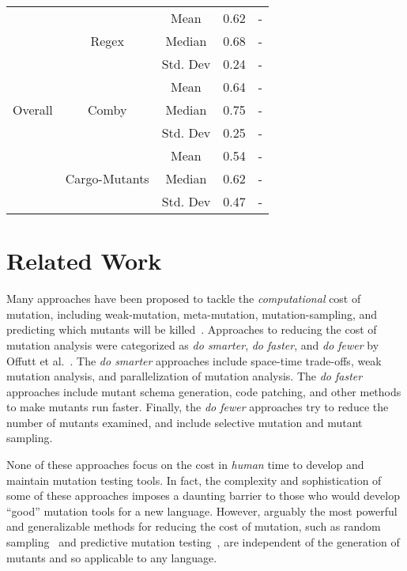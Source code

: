 \documentclass[sigconf,review, anonymous]{acmart}
\begin{document}
{\begin{table}[htbp]
{\begin{tabular}{|c|c|c|c|c|c|}
\multirow{9}{*}{Overall} & \multirow{3}{*}{Regex} & \multicolumn{2}{c|}{Mean} & 0.62  & -\\\cline{3-6}
    &   &  \multicolumn{2}{c|}{Median} & 0.68 & - \\\cline{3-6}
    &   &  \multicolumn{2}{c|}{Std. Dev} & 0.24 & - \\\cline{2-6}

 & \multirow{3}{*}{Comby} & \multicolumn{2}{c|}{Mean} & 0.64 & -\\\cline{3-6}
    &   &  \multicolumn{2}{c|}{Median} & 0.75 & - \\\cline{3-6}
    &   &  \multicolumn{2}{c|}{Std. Dev} & 0.25 & - \\\cline{2-6}

 & \multirow{3}{*}{Cargo-Mutants} & \multicolumn{2}{c|}{Mean} & 0.54 & -\\\cline{3-6}
    &   &  \multicolumn{2}{c|}{Median} & 0.62 & - \\\cline{3-6}
    &   &  \multicolumn{2}{c|}{Std. Dev} & 0.47 & - \\ \hline
    
    
\end{tabular}
}
\end{table}

\section{Related Work}

Many approaches have been proposed to tackle the \emph{computational} cost of mutation, including weak-mutation, 
meta-mutation, mutation-sampling, and predicting which mutants will be
killed~\cite{offuttMutant1996,
  untch1993mutation,KaufmanFAKAJ2022,zhang2016pmt}.  Approaches to reducing the cost of
mutation analysis were categorized as \textit{do smarter}, \textit{do
faster}, and \textit{do fewer} by Offutt et al.~\cite{offutt2001mutation}.
The \textit{do smarter} approaches include space-time trade-offs, weak
mutation analysis, and parallelization of mutation analysis. The \textit{do
faster} approaches include mutant schema generation, code patching, and
other methods to make mutants run faster. Finally, the
\textit{do fewer} approaches try to reduce the number of mutants examined,
and include selective mutation and mutant sampling.

None of these approaches focus on the cost in \emph{human} time to
develop and maintain mutation testing tools.  In fact, the complexity
and sophistication of some of these approaches imposes a daunting
barrier to those who would develop ``good'' mutation tools for a new
language.  However, arguably the most powerful and generalizable
methods for reducing the cost of mutation, such as random sampling~\cite{GopinathSampleSize,gopinath2017mutation} and
predictive mutation testing~\cite{zhang2016pmt,kim2022predictive}, are independent of the generation of
mutants and so applicable to any language.

}
\end{document}
